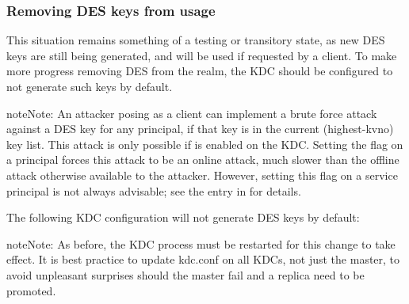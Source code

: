 \documentclass[letterpaper,10pt,english]{sphinxmanual}
\begin{document}
\subsubsection{Removing DES keys from usage}
\label{\detokenize{admin/advanced/retiring-des:removing-des-keys-from-usage}}
This situation remains something of a testing or transitory state,
as new DES keys are still being generated, and will be used if requested
by a client.  To make more progress removing DES from the realm, the KDC
should be configured to not generate such keys by default.

\begin{sphinxadmonition}{note}{Note:}
An attacker posing as a client can implement a brute force attack against
a DES key for any principal, if that key is in the current (highest-kvno)
key list.  This attack is only possible if 
is enabled on the KDC.  Setting the  flag on a
principal forces this attack to be an online attack, much slower than
the offline attack otherwise available to the attacker.  However, setting
this flag on a service principal is not always advisable; see the entry in
{\hyperref[\detokenize{admin/admin_commands/kadmin_local:add-principal}]{}} for details.
\end{sphinxadmonition}

The following KDC configuration will not generate DES keys by default:

%
\begin{sphinxVerbatim}[commandchars=\\\{\}]
\PYG{p}{[}\PYG{p}{]}
          
                     
\end{sphinxVerbatim}

\begin{sphinxadmonition}{note}{Note:}
As before, the KDC process must be restarted for this change to take
effect.  It is best practice to update kdc.conf on all KDCs, not just the
master, to avoid unpleasant surprises should the master fail and a
replica need to be promoted.
\end{sphinxadmonition}
\end{document}
